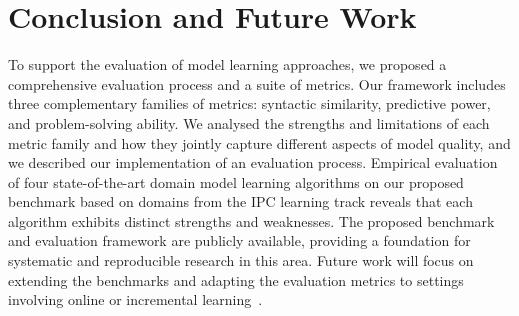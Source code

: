\documentclass[letterpaper]{article} %
\newcommand{\miniparagraph}[1]{\textbf{#1.}}
\newcommand{\commentout}[1]{ }
\newif\ifaddcomments
\newcommand{\brendan}[1]{\ifaddcomments{\textcolor{brown}{[Brendan: {#1}]}}\fi}
\begin{document}
\section{Conclusion and Future Work}
To support the evaluation of model learning approaches, we proposed a comprehensive evaluation process and a suite of metrics. Our framework includes three complementary families of metrics: syntactic similarity, predictive power, and problem-solving ability. We analysed the strengths and limitations of each metric family and how they jointly capture different aspects of model quality, and we described our implementation of an evaluation process. %
Empirical evaluation of four state-of-the-art domain model learning algorithms on our proposed benchmark based on domains from the IPC learning track reveals that each algorithm exhibits distinct strengths and weaknesses.
The proposed benchmark and evaluation framework are publicly available, providing a foundation for systematic and reproducible research in this area.
Future work will focus on extending the benchmarks and adapting the evaluation metrics to settings involving online or incremental learning~\citep{lamanna2021online, sreedharan2023optimistic, benyamin2025integratingreinforcementlearningaction, ng2019incremental, chitnis2021glib, jin2022creativity, verma2023autonomous, karia2023epistemic}. 


\commentout{
\miniparagraph{Online learning of domain models}
Here, the learning algorithm is required to learn a domain model by actively interacting with the environment~\citep{lamanna2021online, sreedharan2023optimistic, benyamin2025integratingreinforcementlearningaction, ng2019incremental, chitnis2021glib, jin2022creativity, verma2023autonomous, karia2023epistemic}. 
All the proposed metrics can be computed as-is, after a predefined number of iterations, for the online learning setting. 
However, an additional perspective that may be of interest in online learning of domain models is \emph{cumulative} metrics of the learning process, such as the number of actions performed for learning or the number of problems failed to solve while collecting observations.
Specific metrics and evaluation for online learning of domain models, however, are beyond the scope of this work. 
}
\end{document}

